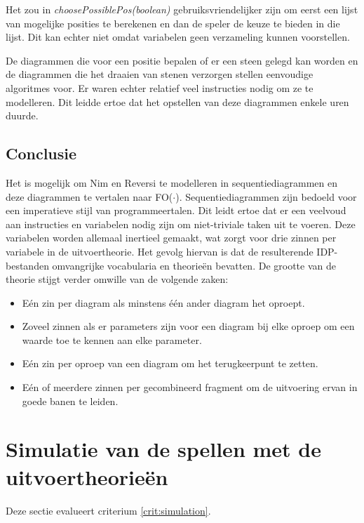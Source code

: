 Het zou in \textit{choosePossiblePos(boolean)} gebruiksvriendelijker zijn om eerst een lijst van mogelijke posities te berekenen en dan de speler de keuze te bieden in die lijst. Dit kan echter niet omdat variabelen geen verzameling kunnen voorstellen.

De diagrammen die voor een positie bepalen of er een steen gelegd kan worden en de diagrammen die het draaien van stenen verzorgen stellen eenvoudige algoritmes voor. Er waren echter relatief veel instructies nodig om ze te modelleren. Dit leidde ertoe dat het opstellen van deze diagrammen enkele uren duurde.

\subsection{Conclusie}\label{sec:design-conclusion}

Het is mogelijk om Nim en Reversi te modelleren in sequentiediagrammen en deze diagrammen te vertalen naar FO($\cdot$). Sequentiediagrammen zijn bedoeld voor een imperatieve stijl van programmeertalen. Dit leidt ertoe dat er een veelvoud aan instructies en variabelen nodig zijn om niet-triviale taken uit te voeren. Deze variabelen worden allemaal inertieel gemaakt, wat zorgt voor drie zinnen per variabele in de uitvoertheorie. Het gevolg hiervan is dat de resulterende IDP-bestanden omvangrijke vocabularia en theorie\"en bevatten. De grootte van de theorie stijgt verder omwille van de volgende zaken:

\begin{itemize}
	\item E\'en zin per diagram als minstens \'e\'en ander diagram het oproept.
	\item Zoveel zinnen als er parameters zijn voor een diagram bij elke oproep om een waarde toe te kennen aan elke parameter.
	\item E\'en zin per oproep van een diagram om het terugkeerpunt te zetten.
	\item E\'en of meerdere zinnen per gecombineerd fragment om de uitvoering ervan in goede banen te leiden.
\end{itemize}

\section{Simulatie van de spellen met de uitvoertheorie\"en}

Deze sectie evalueert criterium \ref{crit:simulation}.

